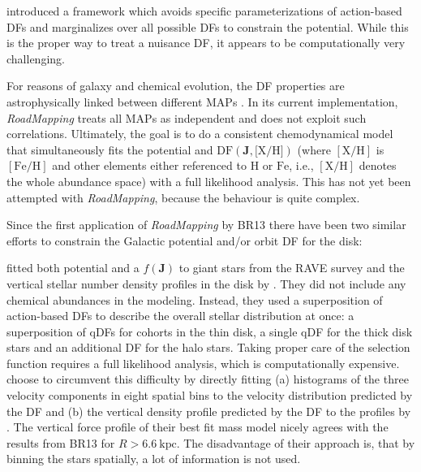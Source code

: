 \documentclass[iop,revtex4,numberedappendix,appendixfloats]{emulateapj}
\newcommand{\vect}[1]{\boldsymbol{#1}}
\newcommand{\MAPs}{MAPs}
\newcommand{\RM}{{\sl RoadMapping}}
\begin{document}
\citet{2014MNRAS.437.2230M} introduced a framework which avoids specific parameterizations of action-based DFs and marginalizes over all possible DFs to constrain the potential. While this is the proper way to treat a nuisance DF, it appears to be computationally very challenging.

For reasons of galaxy and chemical evolution, the DF properties are astrophysically linked between different \MAPs{} \citep{2015MNRAS.449.3479S}. In its current implementation, \RM{} treats all \MAPs{} as independent and does not exploit such correlations. Ultimately, the goal is to do a consistent chemodynamical model that simultaneously fits the potential and $\text{DF}(\vect{J},\text{[X/H]})$ (where $[\mathrm{X}/\mathrm{H}]$ is $[\mathrm{Fe}/\mathrm{H}]$ and other elements either referenced to $\mathrm{H}$ or $\mathrm{Fe}$, i.e., $[\mathrm{X}/\mathrm{H}]$ denotes the whole abundance space) with a full likelihood analysis. This has not yet been attempted with \RM{}, because the behaviour is quite complex. 

Since the first application of \RM{} by BR13 there have been two similar efforts to constrain the Galactic potential and/or orbit DF for the disk:

\citet{2014MNRAS.445.3133P} fitted both potential and a $f(\vect{J})$ to giant stars from the RAVE survey \citep{2006AJ....132.1645S} and the vertical stellar number density profiles in the disk by \citet{2008ApJ...673..864J}. They did not include any chemical abundances in the modeling. Instead, they used a superposition of action-based DFs to describe the overall stellar distribution at once: a superposition of qDFs for cohorts in the thin disk, a single qDF for the thick disk stars and an additional DF for the halo stars. Taking proper care of the selection function requires a full likelihood analysis, which is computationally expensive. \citet{2014MNRAS.445.3133P} choose to circumvent this difficulty by directly fitting (a) histograms of the three velocity components in eight spatial bins to the velocity distribution predicted by the DF and (b) the vertical density profile predicted by the DF to the profiles by \citet{2008ApJ...673..864J}. The vertical force profile of their best fit mass model nicely agrees with the results from BR13 for $R>6.6~\text{kpc}$. The disadvantage of their approach is, that by binning the stars spatially, a lot of information is not used.
\end{document}
